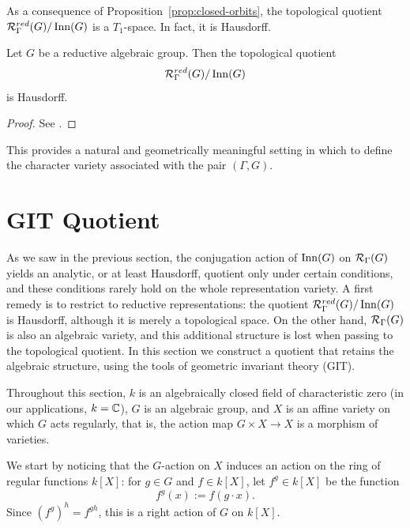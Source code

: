 As a consequence of Proposition~\ref{prop:closed-orbits}, the topological quotient $\RepVar{\Gamma}{G}[red] / \Inn(G)$ is a $T_1$-space. In fact, it is Hausdorff.

\begin{proposition}\label{prop:red-hausdorff}
    Let $G$ be a reductive algebraic group. Then the topological quotient
    \[
        \RepVar{\Gamma}{G}[red] / \Inn(G)
    \]
    is Hausdorff.
\end{proposition}

\begin{proof}
    See \cite[\S 7.3]{richardsonMinimumVectorsReal1990}.
\end{proof}

This provides a natural and geometrically meaningful setting in which to define the character variety associated with the pair $(\Gamma, G)$.



\section{GIT Quotient}

As we saw in the previous section, the conjugation action of $\operatorname{Inn}(G)$ on $\RepVar{\Gamma}{G}$ yields an analytic, or at least Hausdorff, quotient only under certain conditions, and these conditions rarely hold on the whole representation variety. A first remedy is to restrict to reductive representations: the quotient $\RepVar{\Gamma}{G}[red]/\Inn(G)$ is Hausdorff, although it is merely a topological space. On the other hand, $\RepVar{\Gamma}{G}$ is also an algebraic variety, and this additional structure is lost when passing to the topological quotient. In this section we construct a quotient that retains the algebraic structure, using the tools of geometric invariant theory (GIT).

\nocite{zamorasaizGeometricInvariantTheory2021}

Throughout this section, $k$ is an algebraically closed field of characteristic zero (in our applications, $k = \mathbb{C}$), $G$ is an algebraic group, and $X$ is an affine variety on which $G$ acts regularly, that is, the action map $G \times X \to X$ is a morphism of varieties.

We start by noticing that the $G$-action on $X$ induces an action on the ring of regular functions $k[X]$: for $g \in G$ and $f \in k[X]$, let $f^g \in k[X]$ be the function
\[
    f^g(x) := f(g \cdot x).
\]
Since $(f^g)^h = f^{gh}$, this is a right action of $G$ on $k[X]$.

